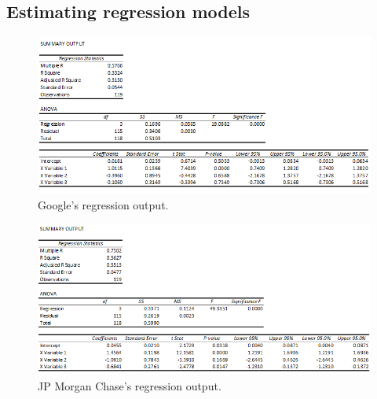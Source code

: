 \documentclass[12pt]{article}
\begin{document}
\subsection{Estimating regression models}
\begin{figure}[H]
\begin{center}
\includegraphics[width=6in]{images/google-regression.png}
\end{center}
\caption{Google's regression output.\label{fig:google-regression}}
\end{figure}
\begin{figure}[H]
\begin{center}
\includegraphics[width=6in]{images/jp-morgan-chase-regression.png}
\end{center}
\caption{JP Morgan Chase's regression output.\label{fig:jp-morgan-chase-regression}}
\end{figure}
\end{document}
